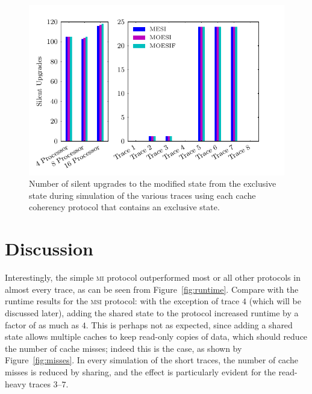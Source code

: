 \documentclass{article}
\newcommand\figsize{.9\linewidth}
\newcommand\prot[1]{\textsc{#1}}
\newcommand\MI{\prot{mi}\xspace}
\newcommand\MSI{\prot{msi}\xspace}
\begin{document}
  \begin{figure}[htbp]
    \label{fig:upgrades}
    \centering
    \begin{minipage}[t]{\figsize}
      \centering
      \includegraphics[width=\linewidth]{../runs/plots/upgrades}
      \caption{Number of silent upgrades to the modified state from
        the exclusive state during simulation of the various traces
        using each cache coherency protocol that contains an exclusive
        state.}
    \end{minipage}
  \end{figure}


  \section{Discussion}
  \label{sec:discussion}

  Interestingly, the simple \MI protocol outperformed most or all
  other protocols in almost every trace, as can be seen from
  Figure~\ref{fig:runtime}. Compare with the runtime results for the
  \MSI protocol: with the exception of trace $4$ (which will be
  discussed later), adding the shared state to the protocol increased
  runtime by a factor of as much as $4$. This is perhaps not as
  expected, since adding a shared state allows multiple caches to keep
  read-only copies of data, which should reduce the number of cache
  misses; indeed this is the case, as shown by
  Figure~\ref{fig:misses}. In every simulation of the short traces,
  the number of cache misses is reduced by sharing, and the effect is
  particularly evident for the read-heavy traces $3$--$7$.
\end{document}
